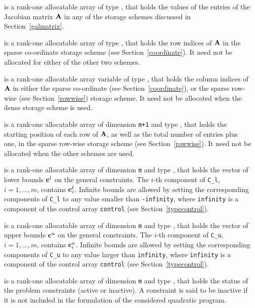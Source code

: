 \documentclass{galahad}
\begin{document}
\begin{description}
\begin{description}
 is a rank-one allocatable array of type \realdp, that holds
the values of the entries of the Jacobian matrix ${\mathbf{A}}$ in any of the
storage schemes discussed in Section~\ref{galmatrix}.

 is a rank-one allocatable array of type \integer,
that holds the row indices of ${\mathbf{A}}$ in the sparse co-ordinate storage
scheme (see Section~\ref{coordinate}).
It need not be allocated for either of the other two schemes.

 is a rank-one allocatable array variable of type \integer,
that holds the column indices of ${\mathbf{A}}$ in either the sparse co-ordinate
(see Section~\ref{coordinate}), or the sparse row-wise
(see Section~\ref{rowwise}) storage scheme.
It need not be allocated when the dense storage scheme is used.

 is a rank-one allocatable array of dimension {\tt m+1} and type
\integer, that holds the
starting position of each row of ${\mathbf{A}}$, as well
as the total number of entries plus one, in the sparse row-wise storage
scheme (see Section~\ref{rowwise}). It need not be allocated when the
other schemes are used.

\end{description}

 is a rank-one allocatable array of dimension {\tt m} and type
\realdp, that holds the vector of lower bounds ${\mathbf{c}}^{l}$
on the general constraints. The $i$-th component of
{\tt C\_l}, $i = 1, \ldots , m$, contains ${\mathbf{c}}_{i}^{l}$.
Infinite bounds are allowed by setting the corresponding
components of {\tt C\_l} to any value smaller than {\tt -infinity},
where {\tt infinity} is a component of the control array {\tt control}
(see Section~\ref{typecontrol}).

 is a rank-one allocatable array of dimension {\tt m} and type
\realdp, that holds the vector of upper bounds ${\mathbf{c}}^{u}$
on the general constraints. The $i$-th component of
{\tt C\_u}, $i = 1,  \ldots ,  m$, contains ${\mathbf{c}}_{i}^{u}$.
Infinite bounds are allowed by setting the corresponding
components of {\tt C\_u} to any value larger than {\tt infinity},
where {\tt infinity} is a component of the control array {\tt control}
(see Section~\ref{typecontrol}).

 is a rank-one allocatable array of dimension {\tt m} and type
\integer, that holds the status of the problem constraints (active or
inactive). A constraint is said to be inactive if it is not included in the
formulation of the considered quadratic program.


\end{description}
\end{document}

